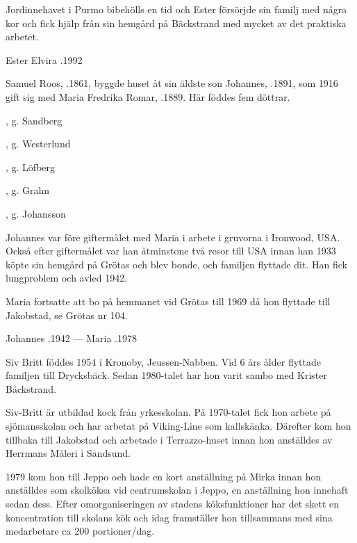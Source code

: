 Jordinnehavet i Purmo bibehölls en tid och Ester försörjde sin familj med några kor och fick hjälp från sin hemgård på Bäckstrand med mycket av det praktiska arbetet.

Ester Elvira .1992


%
Samuel Roos, .1861, byggde huset åt sin äldste son Johannes, .1891, som 1916 gift sig med Maria Fredrika Romar, .1889. Här föddes fem döttrar.
\begin{jhchildren}
  \item {}, g. Sandberg
  \item {}, g. Westerlund
  \item {}, g. Löfberg
  \item {}, g. Grahn
  \item {}, g. Johansson
\end{jhchildren}
Johannes var före giftermålet med Maria i arbete i gruvorna i Ironwood, USA. Också efter giftermålet var han åtminstone två resor till USA innan han 1933 köpte sin hemgård på Grötas och blev bonde, och familjen flyttade dit. Han fick lungproblem och avled 1942.

Maria fortsatte att bo på hemmanet vid Grötas till 1969 då hon flyttade till Jakobstad, se Grötas nr 104.

Johannes .1942 --- Maria .1978



%



%
Siv Britt föddes 1954 i Kronoby, Jeussen-Nabben. Vid 6 års ålder flyttade familjen till Drycksbäck. Sedan 1980-talet har hon varit sambo med Krister Bäckstrand.

Siv-Britt är utbildad kock från yrkesskolan. På 1970-talet fick hon arbete på sjömansskolan och  har arbetat på Viking-Line som kallskänka. Därefter kom hon tillbaka till Jakobstad och arbetade i Terrazzo-huset innan hon anställdes av Herrmans Måleri i Sandsund.

1979 kom hon till Jeppo och hade en kort anställning på Mirka innan hon anställdes som skolköksa vid centrumskolan i Jeppo, en anställning hon innehaft sedan dess. Efter omorganiseringen av stadens köksfunktioner har det skett en koncentration till skolans kök och idag framställer hon tillsammans med sina medarbetare ca 200 portioner/dag.


